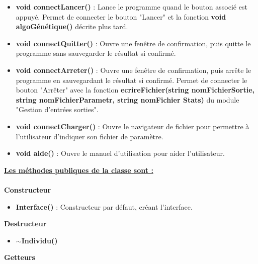 \documentclass[a4paper,11pt]{article}
\begin{document}
			\begin{itemize}
				\item \textbf{void connectLancer()} : Lance le programme quand le bouton associé est appuyé. Permet de connecter le bouton "Lancer" et la fonction \textbf{void algoGénétique()} décrite plus tard.\vspace{0.2cm}
				\item \textbf{void connectQuitter()} : Ouvre une fenêtre de confirmation, puis quitte le programme sans sauvegarder le résultat si confirmé.\vspace{0.2cm}
				\item \textbf{void connectArreter()} : Ouvre une fenêtre de confirmation, puis arrête le programme en sauvegardant le résultat si confirmé. Permet de connecter le bouton "Arrêter" avec la fonction \textbf{ecrireFichier(string nomFichierSortie, string nomFichierParametr, string nomFichier Stats)} du module "Gestion d'entrées sorties".\vspace{0.2cm} 
				\item \textbf{void connectCharger()} : Ouvre le navigateur de fichier pour permettre à l’utilisateur d’indiquer son fichier de paramètre.\vspace{0.2cm}
				\item \textbf{void aide()} : Ouvre le manuel d’utilisation pour aider l’utilisateur.\\
			\end{itemize}
			\underline{\bf Les méthodes publiques de la classe sont :}\\\\
			\textbf{Constructeur}
				\begin{itemize}
					\item \textbf{Interface()} : Constructeur par défaut, créant l'interface.\\
					\end{itemize}
			\textbf{Destructeur}
				\begin{itemize}
					\item \textbf{$\sim$Individu()}\\
				\end{itemize}
			\textbf{Getteurs}
\end{document}
